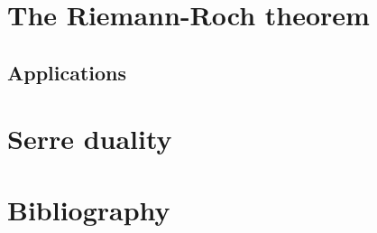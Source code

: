 \documentclass[12pt]{article}
\begin{document}
\section{The Riemann-Roch theorem}
\subsection{Applications}

\section{Serre duality}

\section{Bibliography}


\end{document}
